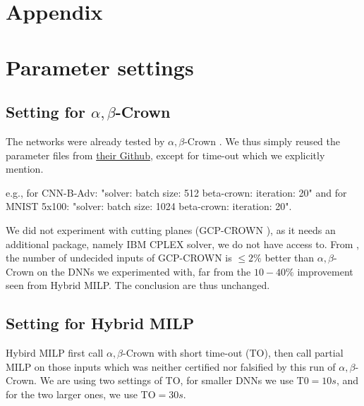 \vspace{-0.6cm}

\section*{Appendix}

\section{Parameter settings}




\subsection*{Setting for $\alpha,\beta$-Crown}

The networks were already tested by $\alpha,\beta$-Crown \cite{crown}. We thus simply reused the parameter files from \href{https://github.com/Verified-Intelligence/alpha-beta-CROWN/blob/main/complete_verifier/exp_configs/beta_crown/}{their Github}, 
except for time-out which we explicitly mention.

e.g., for CNN-B-Adv: "solver: batch size: 512 beta-crown: iteration: 20" and
for MNIST 5x100: "solver: batch size: 1024 beta-crown: iteration: 20".

We did not experiment with cutting planes (GCP-CROWN \cite{cutting}), as it needs an additional package, namely IBM CPLEX solver, we do not have access to. From \cite{cutting}, the number of undecided inputs of GCP-CROWN is $\leq 2\%$ better than $\alpha,\beta$-Crown on the DNNs we experimented with, far from the $10-40\%$ improvement seen from Hybrid MILP. The conclusion are thus unchanged.


\subsection*{Setting for Hybrid MILP}


Hybird MILP first call $\alpha,\beta$-Crown with short time-out (TO), then call partial MILP on those inputs which was neither certified nor falsified by this run of $\alpha,\beta$-Crown. We are using two settings of TO, for smaller DNNs we use T0$=10s$, and for the two larger ones, we use TO$=30s$.

